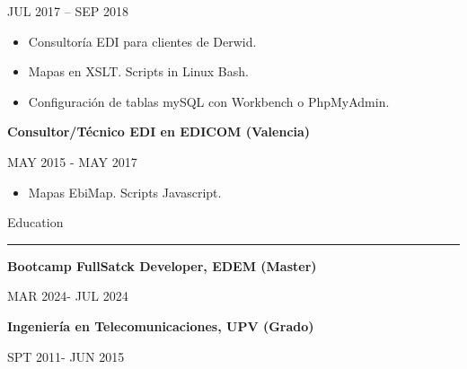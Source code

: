 \documentclass{letter}
\begin{document}
\begin{minipage}[t]{0.60\textwidth}
{\small JUL 2017 – SEP 2018}

\begin{itemize}
    \item Consultoría EDI para clientes de Derwid.
    \item Mapas en XSLT. Scripts in Linux Bash.
    \item Configuración de tablas mySQL con Workbench o PhpMyAdmin.
\end{itemize}

{\large \textbf{Consultor/Técnico EDI en EDICOM (Valencia)}}

{\small MAY 2015 - MAY 2017}
\begin{itemize}
    \item Mapas EbiMap. Scripts Javascript. 
\end{itemize}

{\large Education}
\rule{\linewidth}{0.4pt}

{\large \textbf{Bootcamp FullSatck Developer, EDEM (Master)}}

{\small MAR 2024- JUL 2024}

{\large \textbf{Ingeniería en Telecomunicaciones, UPV (Grado)}}

{\small SPT 2011- JUN 2015}


\end{minipage}
\end{document}
